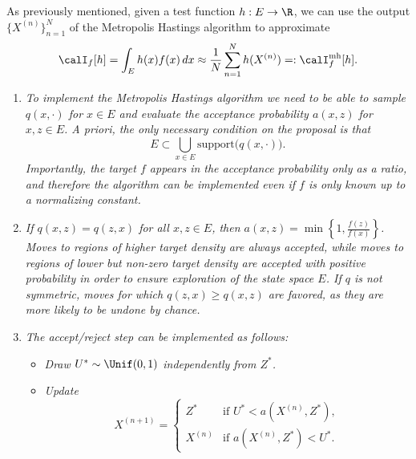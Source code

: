 As previously mentioned, given a test function $h : E \to \R$, we can use the output $\{X^{(n)}\}_{n=1}^{N}$
of the Metropolis Hastings algorithm to approximate
\[
  \calI_f[h] = \int_E h(x) f(x)\, dx
  \approx \frac{1}{N} \sum_{n=1}^{N} h(X^{(n)}) =: \calI_f^{\mathrm{mh}}[h].
\]

\begin{remark}
\label{rem:4.1}
\begin{enumerate}
\item \textit{To implement the Metropolis Hastings algorithm we need to be able to sample $q(x, \cdot)$ for
$x \in E$ and evaluate the acceptance probability $a(x, z)$ for $x, z \in E$. A priori, the only
necessary condition on the proposal is that}
\[
  E \subset \bigcup_{x \in E} \mathrm{support}\bigl(q(x, \cdot)\bigr).
\]
\textit{Importantly, the target $f$ appears in the acceptance probability only as a ratio, and therefore the algorithm can be implemented even if $f$ is only known up to a normalizing constant.}

\item \textit{If $q(x, z) = q(z, x)$ for all $x, z \in E$, then $a(x, z) = \min\!\left\{1, \frac{f(z)}{f(x)}\right\}$.
Moves to regions of higher target density are always accepted, while moves to regions of lower but non-zero
target density are accepted with positive probability in order to ensure exploration of the
state space $E$. If $q$ is not symmetric, moves for which $q(z, x) \geq q(x, z)$ are favored, as
they are more likely to be undone by chance.}

\item \textit{The accept/reject step can be implemented as follows:}
\begin{itemize}
  \item \textit{Draw $U^* \sim \Unif(0, 1)$ independently from $Z^*$.}
  \item \textit{Update}
\[
  X^{(n+1)} =
  \begin{cases}
    Z^*     & \text{if } U^* < a(X^{(n)}, Z^*),\\
    X^{(n)} & \text{if } a(X^{(n)}, Z^*) < U^*.
  \end{cases}
\]
\end{itemize}
\end{enumerate}
\end{remark}

